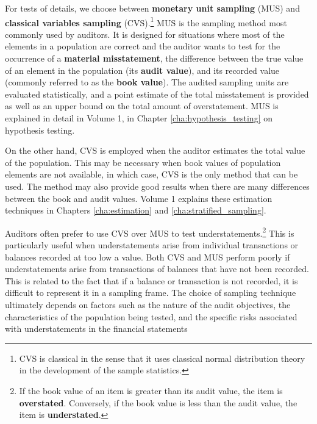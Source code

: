 For tests of details, we choose between \textbf{monetary unit sampling} (MUS) and \textbf{classical variables sampling} (CVS).\footnote{CVS is classical in the sense that it uses classical normal distribution theory in the development of the sample statistics.} MUS is the sampling method most commonly used by auditors. It is designed for situations where most of the elements in a population are correct and the auditor wants to test for the occurrence of a \textbf{material misstatement}, the difference between the true value of an element in the population (its \textbf{audit value}), and its recorded value (commonly referred to as the \textbf{book value}). The audited sampling units are evaluated statistically, and a point estimate of the total misstatement is provided as well as an upper bound on the total amount of overstatement. MUS is explained in detail in Volume 1, in Chapter \ref{cha:hypothesis_testing} on hypothesis testing.

On the other hand, CVS is employed when the auditor estimates the total value of the population. This may be necessary when book values of population elements are not available, in which case, CVS is the only method that can be used. The method may also provide good results when there are many differences between the book and audit values. Volume 1 explains these estimation techniques in Chapters \ref{cha:estimation} and \ref{cha:stratified_sampling}.

Auditors often prefer to use CVS over MUS to test understatements.\footnote{If the book value of an item is greater than its audit value, the item is \textbf{overstated}. Conversely, if the book value is less than the audit value, the item is \textbf{understated}. } This is particularly useful when understatements arise from individual transactions or balances recorded at too low a value. Both CVS and MUS perform poorly if understatements arise from transactions of balances that have not been recorded. This is related to the fact that if a balance or transaction is not recorded, it is difficult to represent it in a sampling frame. The choice of sampling technique ultimately depends on factors such as the nature of the audit objectives, the characteristics of the population being tested, and the specific risks associated with understatements in the financial statements

